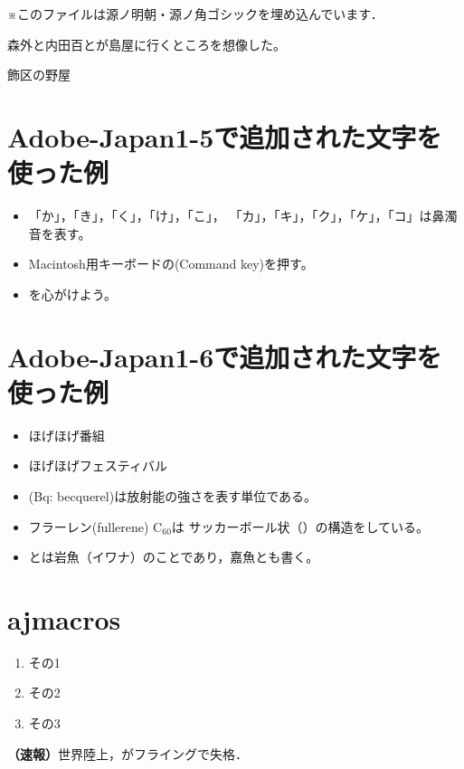 \documentclass{ltjsarticle}
\begin{document}
※このファイルは源ノ明朝・源ノ角ゴシックを埋め込んでいます．

森外と内田百とが島屋に行くところを想像した。

飾区の野屋

\section*{Adobe-Japan1-5で追加された文字を使った例}
\begin{itemize}
  \item 「\゜か」，「\゜き」，「\゜く」，「\゜け」，「\゜こ」，
        「\゜カ」，「\゜キ」，「\゜ク」，「\゜ケ」，「\゜コ」は鼻濁音を表す。
  \item Macintosh用キーボードの(Command key)を押す。
  \item {}を心がけよう。
\end{itemize}

\section*{Adobe-Japan1-6で追加された文字を使った例}
\begin{itemize}
  \item ほげほげ番組
  \item ほげほげフェスティバル
  \item {}(Bq: becquerel)は放射能の強さを表す単位である。
  \item フラーレン(fullerene) C$_{60}$は
        サッカーボール状（）の構造をしている。
  \item {}とは岩魚（イワナ）のことであり，嘉魚とも書く。
\end{itemize}

\section*{ajmacros}

\begin{enumerate}\renewcommand{\labelenumi}{\ajLabel\ajKuroKaku{enumi}}
\item その1
\item その2
\item その3
\end{enumerate}

{\bf（速報）}世界陸上，がフライングで失格．


%
\end{document}
